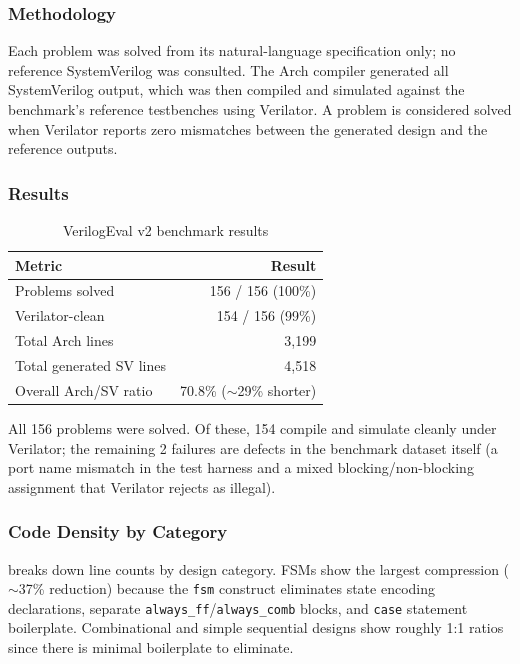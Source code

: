 \documentclass[11pt,twocolumn]{article}
\begin{document}
\subsubsection{Methodology}

Each problem was solved from its natural-language specification only; no reference SystemVerilog was consulted. The Arch compiler generated all SystemVerilog output, which was then compiled and simulated against the benchmark's reference testbenches using Verilator. A problem is considered solved when Verilator reports zero mismatches between the generated design and the reference outputs.

\subsubsection{Results}

\begin{table}[t]
\centering
\caption{VerilogEval v2 benchmark results}
\label{tab:benchmark}
\small
\begin{tabular}{@{}lr@{}}
\toprule
\textbf{Metric} & \textbf{Result} \\
\midrule
Problems solved & 156 / 156 (100\%) \\
Verilator-clean & 154 / 156 (99\%) \\
Total Arch lines & 3,199 \\
Total generated SV lines & 4,518 \\
Overall Arch/SV ratio & 70.8\% (${\sim}$29\% shorter) \\
\bottomrule
\end{tabular}
\end{table}

All 156 problems were solved. Of these, 154 compile and simulate cleanly under Verilator; the remaining 2 failures are defects in the benchmark dataset itself (a port name mismatch in the test harness and a mixed blocking/non-blocking assignment that Verilator rejects as illegal).

\subsubsection{Code Density by Category}

 breaks down line counts by design category. FSMs show the largest compression (${\sim}$37\% reduction) because the \texttt{fsm} construct eliminates state encoding declarations, separate \texttt{always\_ff}/\texttt{always\_comb} blocks, and \texttt{case} statement boilerplate. Combinational and simple sequential designs show roughly 1:1 ratios since there is minimal boilerplate to eliminate.
\end{document}
